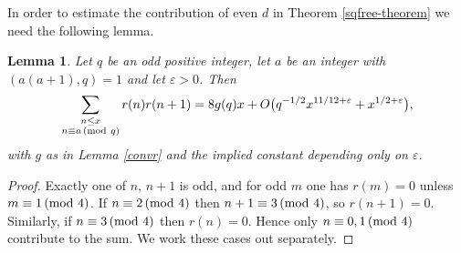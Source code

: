 \documentclass[12pt]{amsart}
\newtheorem{lemma}{Lemma}
\theoremstyle{remark}
\renewcommand{\pmod}[1]{\mkern3mu(\mathrm{mod}\ #1)}
\begin{document}
In order to estimate the contribution of even $d$ in Theorem \ref{sqfree-theorem} we need the following lemma.

\begin{lemma}\label{convr-even}
    Let $q$ be an odd positive integer, let $a$ be an integer with $(a(a+1),q) = 1$ and let
    $\varepsilon > 0$. Then
    \[
        \sum_{\substack{n \le x\\ n \equiv a \pmod q}} r(n) r(n+1)
        = 8g(q)x + O\bigl(q^{-1/2}x^{11/12+\varepsilon}+x^{1/2+\varepsilon}\bigr),
    \]
    with $g$ as in Lemma \ref{convr} and the implied constant depending only on $\varepsilon$.
\end{lemma}

\begin{proof}
    Exactly one of $n$, $n+1$ is odd, and for odd $m$ one has $r(m) = 0$ unless $m \equiv 1 \pmod 4$. If $n \equiv 2 \pmod 4$ then $n+1 \equiv 3 \pmod 4$, so $r(n+1) = 0$.
    Similarly, if $n \equiv 3 \pmod 4$ then $r(n) = 0$. 
    Hence only $n \equiv 0, 1 \pmod 4$ contribute to the sum.
    We work these cases out separately.


\end{proof}
\end{document}
